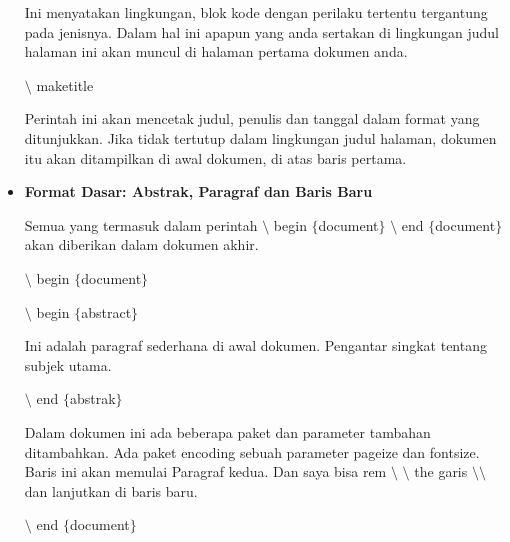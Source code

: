 \begin{itemize}
Ini menyatakan lingkungan, blok kode dengan perilaku tertentu tergantung pada jenisnya. Dalam hal ini apapun yang anda sertakan di lingkungan judul halaman ini akan muncul di halaman pertama dokumen anda.\par
\vspace{\baselineskip}
\hspace*{0.5in}$\setminus$ maketitle\par

Perintah ini akan mencetak judul, penulis dan tanggal dalam format yang ditunjukkan. Jika tidak tertutup dalam lingkungan judul halaman, dokumen itu akan ditampilkan di awal dokumen, di atas baris pertama.\hspace*{0.5in}\par
\vspace{\baselineskip}
\vspace{10pt}
	\item {\fontsize{14pt}{14pt}\selectfont \textbf{Format Dasar: Abstrak, Paragraf dan Baris Baru}}\par
\vspace{\baselineskip}
Semua yang termasuk dalam perintah $\setminus$ begin $ \{ $document$ \} $ $\setminus$ end $ \{ $document$ \} $ akan diberikan dalam dokumen akhir.\par
\vspace{\baselineskip}
\hspace*{0.5in}$\setminus$ begin $ \{ $document$ \} $\par

\hspace*{0.5in}$\setminus$ begin $ \{ $abstract$ \} $\par
\vspace{\baselineskip}
\hspace*{0.5in}Ini adalah paragraf sederhana di awal dokumen. Pengantar singkat tentang subjek utama.\par
\vspace{\baselineskip}
\hspace*{0.5in}$\setminus$ end $ \{ $abstrak$ \} $\par

Dalam dokumen ini ada beberapa paket dan parameter tambahan ditambahkan. Ada paket encoding sebuah parameter pageize dan fontsize. Baris ini akan memulai Paragraf kedua. Dan saya bisa rem $\setminus$ $\setminus$ the garis $\setminus$$\setminus$ dan lanjutkan di baris baru.\par
\vspace{\baselineskip}
\hspace*{0.5in}$\setminus$ end $ \{ $document$ \} $\par


\end{itemize}
